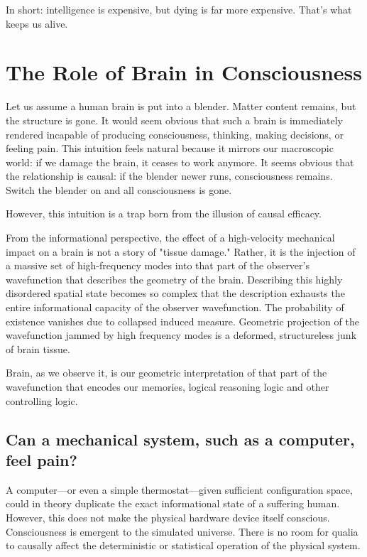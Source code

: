 In short: intelligence is expensive, but dying is far more expensive. That's what keeps us alive. 


\section{The Role of Brain in Consciousness}

Let us assume a human brain is put into a blender. Matter content remains, but the structure is gone.
It would seem obvious that such a brain is immediately rendered incapable of producing consciousness, thinking, making decisions, or feeling pain.
This intuition feels natural because it mirrors our macroscopic world: if we damage the brain, it ceases to work anymore. It seems obvious
that the relationship is causal: if the blender newer runs, consciousness remains. Switch the blender on and all consciousness is gone.

However, this intuition is a trap born from the illusion of causal efficacy. 

From the informational perspective, the effect of a high-velocity mechanical impact on a brain is not a story of "tissue damage."
Rather, it is the injection of a massive set of high-frequency modes into that part of the observer's wavefunction that describes the geometry of the brain.
Describing this highly disordered spatial state becomes so complex that the description exhausts the entire informational capacity of the observer wavefunction. 
The probability of existence vanishes due to collapsed induced measure. Geometric projection of the wavefunction jammed by high frequency modes is
a deformed, structureless junk of brain tissue.

Brain, as we observe it, is our geometric interpretation of that part of the wavefunction that encodes our memories, logical reasoning logic and other
controlling logic.



\subsection*{Can a mechanical system, such as a computer, feel pain?}

A computer—or even a simple thermostat—given sufficient configuration space, could in theory duplicate the exact informational state of a suffering human.
However, this does not make the physical hardware device itself conscious. Consciousness is emergent to the simulated universe. 
There is no room for qualia to causally affect the deterministic or statistical operation of the physical system.


